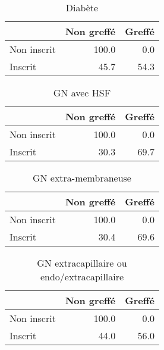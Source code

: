 \documentclass[11pt,a4paper]{article}\usepackage[]{graphicx}\usepackage[]{color}
\begin{document}
\begin{multicols}{2}
\begin{table}[H]
\centering
\begin{tabular}{lrr}
  \hline
 & Non greffé & Greffé \\ 
  \hline
Non inscrit & 100.0 & 0.0 \\ 
  Inscrit & 45.7 & 54.3 \\ 
   \hline
\end{tabular}
\caption{Diabète} 
\end{table}
\begin{table}[H]
\centering
\begin{tabular}{lrr}
  \hline
 & Non greffé & Greffé \\ 
  \hline
Non inscrit & 100.0 & 0.0 \\ 
  Inscrit & 30.3 & 69.7 \\ 
   \hline
\end{tabular}
\caption{GN avec HSF} 
\end{table}
\begin{table}[H]
\centering
\begin{tabular}{lrr}
  \hline
 & Non greffé & Greffé \\ 
  \hline
Non inscrit & 100.0 & 0.0 \\ 
  Inscrit & 30.4 & 69.6 \\ 
   \hline
\end{tabular}
\caption{GN extra-membraneuse} 
\end{table}
\begin{table}[H]
\centering
\begin{tabular}{lrr}
  \hline
 & Non greffé & Greffé \\ 
  \hline
Non inscrit & 100.0 & 0.0 \\ 
  Inscrit & 44.0 & 56.0 \\ 
   \hline
\end{tabular}
\caption{GN extracapillaire ou endo/extracapillaire} 
\end{table}
\begin{table}[H]
\centering
\begin{tabular}{lrr}

\end{tabular}
\end{table}
\end{multicols}
\end{document}
